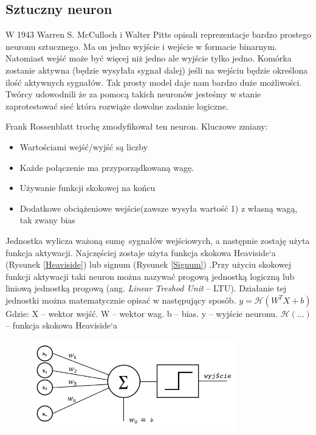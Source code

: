 \documentclass{article}
\begin{document}
\subsection{Sztuczny neuron}
W 1943 Warren S. McCulloch i Walter Pitts opisali reprezentacje bardzo prostego neuronu sztucznego. Ma on jedno wyjście i wejście w formacie binarnym. Natomiast wejść może być więcej niż jedno ale wyjście tylko jedno. Komórka zostanie aktywna (będzie wysyłała sygnał dalej) jeśli na wejściu będzie określona ilość aktywnych sygnałów.\cite{mcculloch1943logical} Tak prosty model daje nam bardzo duże możliwości. Twórcy udowodnili że za pomocą takich neuronów jesteśmy w stanie zaprotestować sieć która rozwiąże dowolne zadanie logiczne.

Frank Rossenblatt trochę zmodyfikował ten neuron.\newline
Kluczowe zmiany:
\begin{itemize}
	\item Wartościami wejść/wyjść są liczby
	\item Każde połączenie ma przyporządkowaną wagę.
	\item Używanie funkcji skokowej na końcu
	\item Dodatkowe obciążeniowe wejście(zawsze wysyła wartość 1) z własną wagą, tak zwany bias
\end{itemize}

Jednostka wylicza ważoną sumę sygnałów wejściowych, a następnie zostaję użyta funkcja aktywacji. Najczęściej zostaje użyta funkcja skokowa Heaviside`a (Rysunek \ref{Heaviside}) lub signum (Rysunek \ref{Signum}) .Przy użyciu skokowej funkcji aktywacji taki neuron można nazywać progową jednostką logiczną lub liniową jednostką progową (ang. \textit{Linear Treshod Unit} -- LTU). Działanie tej jednostki można matematycznie opisać w następujący sposób.\newline\newline
$ y = \mathcal{H}(W^{T}X + b) $\newline \newline
Gdzie: \newline
X -- wektor wejść. \newline
W -- wektor wag. \newline
b -- bias. \newline
y -- wyjście neuronu. \newline
$ \mathcal{H}(...) $ -- funkcja skokowa Heaviside`a\newline

\begin{figure}[H]
	\centering
	\includegraphics[width=0.8\textwidth,keepaspectratio=true]{neuron_rosenblatta}
\end{figure}
\end{document}
